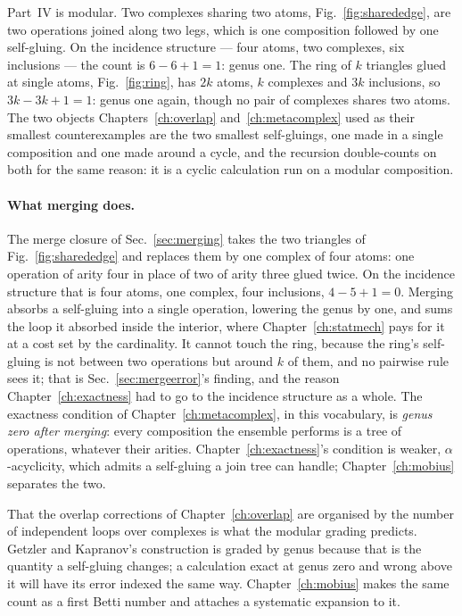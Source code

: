 Part~IV is modular. Two complexes sharing two atoms, Fig.~\ref{fig:sharededge},
are two operations joined along two legs, which is one composition followed
by one self-gluing. On the incidence structure --- four atoms, two complexes,
six inclusions --- the count is $6-6+1=1$: genus one. The ring of $k$
triangles glued at single atoms, Fig.~\ref{fig:ring}, has $2k$ atoms, $k$
complexes and $3k$ inclusions, so $3k-3k+1=1$: genus one again, though no
pair of complexes shares two atoms. The two objects Chapters~\ref{ch:overlap}
and~\ref{ch:metacomplex} used as their smallest counterexamples are the two
smallest self-gluings, one made in a single composition and one made around a
cycle, and the recursion double-counts on both for the same reason: it is a
cyclic calculation run on a modular composition.

\paragraph{What merging does.} The merge closure of Sec.~\ref{sec:merging}
takes the two triangles of Fig.~\ref{fig:sharededge} and replaces them by
one complex of four atoms: one operation of arity four in place of two of
arity three glued twice. On the incidence structure that is four atoms, one
complex, four inclusions, $4-5+1=0$. Merging absorbs a self-gluing into a
single operation, lowering the genus by one, and sums the loop it absorbed
inside the interior, where Chapter~\ref{ch:statmech} pays for it at a cost
set by the cardinality. It cannot touch the ring, because the ring's
self-gluing is not between two operations but around $k$ of them, and no
pairwise rule sees it; that is Sec.~\ref{sec:mergeerror}'s finding, and the
reason Chapter~\ref{ch:exactness} had to go to the incidence structure as a
whole. The exactness condition of Chapter~\ref{ch:metacomplex}, in this
vocabulary, is \emph{genus zero after merging}: every composition the
ensemble performs is a tree of operations, whatever their arities.
Chapter~\ref{ch:exactness}'s condition is weaker, $\alpha$-acyclicity,
which admits a self-gluing a join tree can handle; Chapter~\ref{ch:mobius}
separates the two.

That the overlap corrections of Chapter~\ref{ch:overlap} are organised by
the number of independent loops over complexes is what the modular grading
predicts. Getzler and Kapranov's construction is graded by genus because
that is the quantity a self-gluing changes; a calculation exact at genus zero
and wrong above it will have its error indexed the same way.
Chapter~\ref{ch:mobius} makes the same count as a first Betti number and
attaches a systematic expansion to it.

